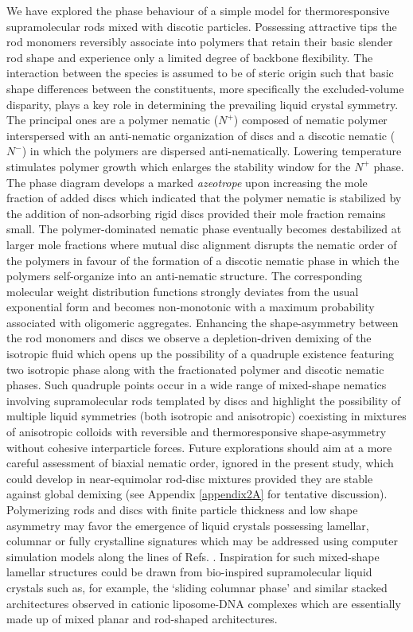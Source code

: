 We have explored the phase behaviour of a simple model for thermoresponsive supramolecular rods mixed with discotic particles. Possessing attractive tips the rod monomers reversibly associate into polymers that retain their basic slender rod shape and experience only a limited degree of backbone flexibility. The interaction between the species is assumed to be  of steric origin such that basic shape differences between the constituents, more specifically the excluded-volume disparity, plays a key role in determining the prevailing liquid crystal symmetry. The principal ones are a   polymer nematic ($N^{+}$) composed of nematic polymer interspersed with an anti-nematic organization of discs and a discotic nematic  ($N^{-}$) in which the polymers are dispersed anti-nematically.   Lowering   temperature stimulates  polymer growth which  enlarges the stability window for the $N^{+}$ phase.  The phase diagram  develops a marked {\em azeotrope} upon increasing the mole fraction of added discs which indicated that the  polymer nematic is stabilized by the addition of non-adsorbing rigid discs provided their mole fraction remains small. 
The polymer-dominated nematic phase eventually becomes destabilized at larger mole fractions where mutual disc alignment disrupts  the nematic  order of the polymers in favour of the formation of a discotic nematic phase in which the polymers self-organize into an anti-nematic structure. The corresponding molecular weight distribution functions strongly deviates from the usual exponential form and becomes non-monotonic with a maximum probability associated with oligomeric aggregates. Enhancing the shape-asymmetry between the rod monomers and discs we observe a depletion-driven demixing of the isotropic fluid which opens up the possibility of a quadruple existence featuring two isotropic phase along with the fractionated polymer and discotic nematic phases. Such quadruple points occur in a wide range of mixed-shape nematics involving supramolecular rods templated by discs and highlight the possibility of multiple liquid symmetries (both isotropic and anisotropic) coexisting in  mixtures of anisotropic colloids with reversible and thermoresponsive shape-asymmetry without cohesive interparticle forces.   Future explorations should aim at a more careful assessment of biaxial nematic order, ignored in the present study,  which could develop in near-equimolar rod-disc mixtures provided they are stable against global demixing (see Appendix \ref{appendix2A} for tentative discussion). Polymerizing rods and discs with finite particle thickness and low shape asymmetry may favor the emergence of liquid crystals possessing lamellar, columnar or fully crystalline signatures  \cite{peroukidis2010} which may be addressed using  computer simulation models along the lines of Refs. \cite{kuriabova2010,nguyen2014,perouklapp2020}. Inspiration for such mixed-shape  lamellar structures  could be drawn from bio-inspired supramolecular liquid crystals \cite{safinya2013} such as, for example, the `sliding columnar phase' and similar stacked architectures  observed in cationic liposome-DNA complexes \cite{wong2000,ohern1998} which are essentially made up of mixed planar and rod-shaped architectures.

